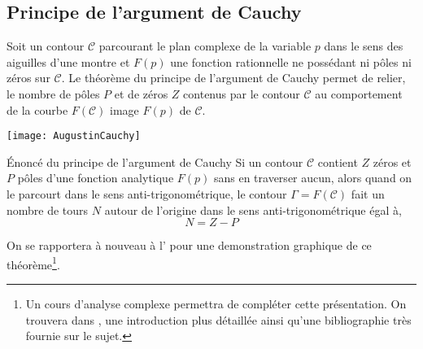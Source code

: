\subsection{Principe de l'argument de Cauchy}
Soit un contour $\mathcal{C}$ parcourant le plan complexe de 
la variable $p$ dans le sens des aiguilles d'une montre et $F(p)$ une fonction 
rationnelle ne possédant ni pôles ni zéros sur $\mathcal{C}$. Le théorème du 
principe de l'argument de Cauchy permet de relier, le nombre de pôles $P$ et 
de zéros $Z$ contenus par le contour $\mathcal{C}$ au comportement de la 
courbe $F(\mathcal{C})$ image $F(p)$ de $\mathcal{C}$.
\begin{marginfigure}
    \centering
    \texttt{[image: AugustinCauchy]} 
    \caption*{\textbf{Augustin Louis Cauchy} 
              (1789-1857), mathématicien français (X1807)}
\end{marginfigure}
\begin{theorem}{\'Enoncé du principe de l'argument de Cauchy
    } 
    Si un contour $\mathcal{C}$ contient $Z$ zéros et $P$ pôles d'une fonction 
    analytique $F(p)$ sans en traverser aucun, alors quand on le parcourt dans 
    le sens anti-trigonométrique, le contour $\Gamma=F(\mathcal{C})$ fait un 
    nombre de tours $N$ autour de l'origine dans le sens anti-trigonométrique 
    égal à,
    \[ 
        N=Z-P
    \]
\end{theorem}
On se rapportera à nouveau à l' pour une demonstration 
graphique de ce théorème\footnote{Un cours d'analyse complexe permettra de 
compléter cette présentation. On trouvera dans \cite{laas_pc7bis,reg}, 
une introduction plus détaillée ainsi qu'une bibliographie très fournie 
sur le sujet.}.

